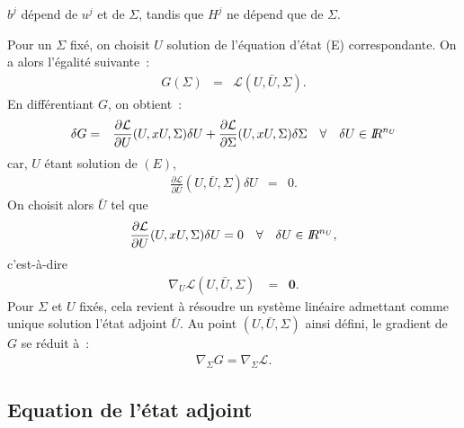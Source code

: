 \begin{Rem}
$b^j$ d\'epend de $u^j$ et de $\Sigma$, tandis que $H^j$ ne d\'epend 
que de $\Sigma$.
\end{Rem}

Pour un $\Sigma$ fix\'e, on choisit $U$ solution de l'\'equation 
d'\'etat (E) correspondante. On a alors l'\'egalit\'e suivante~:
\begin{eqnarray*}
G(\Sigma) &=& \mathcal{L}(U,\bar{U},\Sigma).
\end{eqnarray*}
En diff\'erentiant $G$, on obtient~:
\begin{eqnarray*}
\delta G &=& \frac{\partial \mathcal{L}}{\partial U}(U,x{U},\Sigma)
\delta U + \frac{\partial \mathcal{L}}{\partial\Sigma}
(U,x{U},\Sigma)\delta \Sigma \quad 
\forall \quad\delta U \in I\!\! R^{n_U}
\end{eqnarray*}
car, $U$ \'etant solution de $(E)$, 
\begin{eqnarray*}
\frac{\partial \mathcal{L}}{\partial \bar{U}}(U,\bar{U},\Sigma)
\delta U &=& 0.
\end{eqnarray*}
On choisit alors $\bar{U}$ tel que
\begin{eqnarray*}
\frac{\partial \mathcal{L}}{\partial U}(U,x{U},\Sigma)\delta U = 0 
\quad\forall\quad \delta U \in I\!\! R^{n_U},
\end{eqnarray*}
c'est-\`a-dire
\begin{eqnarray}
\nabla_U\mathcal{L}(U,\bar{U},\Sigma)\ &=& \mathbf{0}.\label{adjoint}
\end{eqnarray}
Pour $\Sigma$ et $U$ fix\'es, cela revient \`a r\'esoudre un 
syst\`eme lin\'eaire admettant comme unique solution l'\'etat adjoint 
$\bar{U}$. Au point $(U,\bar{U},\Sigma)$ ainsi d\'efini, le gradient 
de $G$ se r\'eduit \`a~:
\begin{eqnarray}
\nabla_{\Sigma} G = \nabla_{\Sigma}\mathcal{L}.
\end{eqnarray}

\subsection*{Equation de l'\'etat adjoint}

